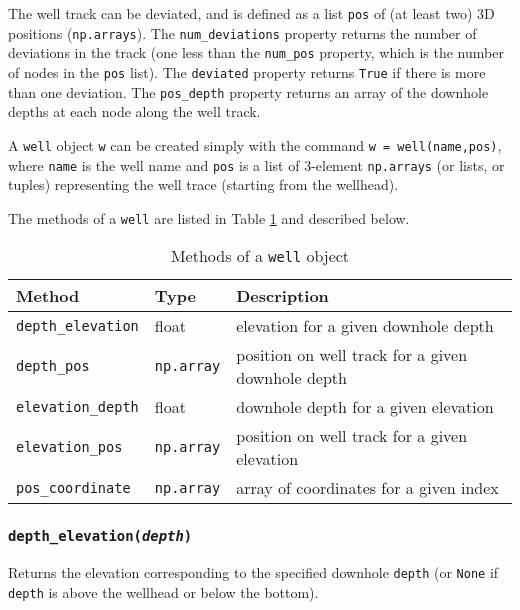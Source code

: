 The well track can be deviated, and is defined as a list \texttt{pos} of (at least two) 3D positions (\texttt{np.arrays}).  The \texttt{num\_deviations} property returns the number of deviations in the track (one less than the \texttt{num\_pos} property, which is the number of nodes in the \texttt{pos} list).  The \texttt{deviated} property returns \texttt{True} if there is more than one deviation.  The \texttt{pos\_depth} property returns an array of the downhole depths at each node along the well track.

A \texttt{well} object \texttt{w} can be created simply with the command \texttt{w = well(name,pos)}, where \texttt{name} is the well name and \texttt{pos} is a list of 3-element \texttt{np.arrays} (or lists, or tuples) representing the well trace (starting from the wellhead).

The methods of a \texttt{well} are listed in Table \ref{tb:well_methods} and described below.

\begin{table}
  \begin{center}
    \begin{tabular}{|l|l|l|}
      \hline
      \textbf{Method} & \textbf{Type} & \textbf{Description}\\
      \hline
      \texttt{depth\_elevation} & float & elevation for a given downhole depth \\
      \texttt{depth\_pos} & \texttt{np.array} & position on well track for a given downhole depth \\
      \texttt{elevation\_depth} & float & downhole depth for a given elevation \\
      \texttt{elevation\_pos} & \texttt{np.array} & position on well track for a given elevation \\
      \texttt{pos\_coordinate} & \texttt{np.array} & array of coordinates for a given index \\
      \hline
    \end{tabular}
    \caption{Methods of a \texttt{well} object}
    \label{tb:well_methods}
  \end{center}
\end{table}

\subsubsection{\texttt{depth\_elevation(\emph{depth})}}

Returns the elevation corresponding to the specified downhole \texttt{depth} (or \texttt{None} if \texttt{depth} is above the wellhead or below the bottom).

